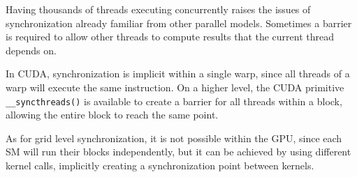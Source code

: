 Having thousands of threads executing concurrently raises the issues of synchronization already familiar from other parallel models. Sometimes a barrier is required to allow other threads to compute results that the current thread depends on.

In CUDA, synchronization is implicit within a single warp, since all threads of a warp will execute the same instruction. On a higher level, the CUDA primitive \texttt{\_\_syncthreads()} is available to create a barrier for all threads within a block, allowing the entire block to reach the same point.

As for grid level synchronization, it is not possible within the GPU, since each SM will run their blocks independently, but it can be achieved by using different kernel calls, implicitly creating a synchronization point between kernels.
